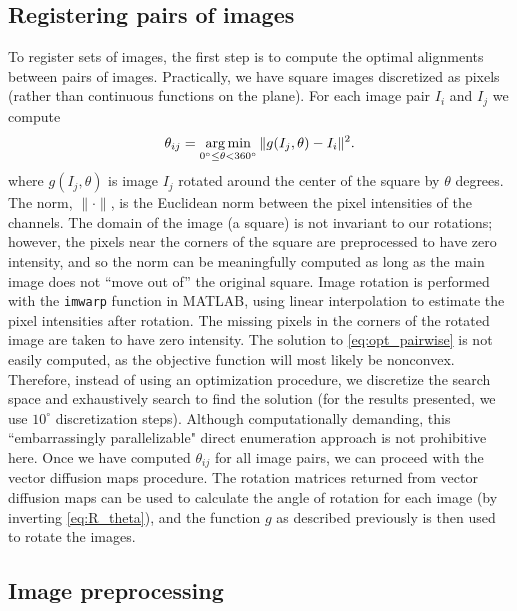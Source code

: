 \subsection{Registering pairs of images} \label{subsec:trans_rot_register}

To register sets of images,
the first step is to compute the optimal alignments between pairs of images.
%
Practically, we have square images discretized as pixels (rather than continuous functions on the plane).
%
For each image pair $I_i$ and $I_j$ we compute
\begin{equation}\label{eq:opt_pairwise}
\theta_{ij} = \operatorname*{arg\,min}_{
0^\circ \le \theta < 360^\circ }
 \|g(I_j, \theta) - I_i \|^2.
\end{equation}
where $g(I_j, \theta)$ is image $I_j$ rotated around the center of the square by $\theta$ degrees.
%
The norm, $\| \cdot \|$, is the Euclidean norm between the pixel intensities of the channels.
%
The domain of the image (a square) is not invariant to our rotations; however, the pixels near the corners of the square are preprocessed to have zero intensity, and so the norm can be meaningfully computed as long as the main image does not ``move out of'' the original square.
%
Image rotation is performed with the \texttt{imwarp} function in MATLAB, using linear interpolation to estimate the pixel intensities after rotation.
%
The missing pixels in the corners of the rotated image are taken to have zero intensity.
%
The solution to \eqref{eq:opt_pairwise} is not easily computed, as the objective function will most likely be nonconvex.
%
Therefore, instead of using an optimization procedure, we discretize the search space and exhaustively search to find the solution (for the results presented, we use $10^\circ$ discretization steps).
%
Although computationally demanding, this ``embarrassingly parallelizable" direct enumeration approach is not prohibitive here.
%
Once we have computed $\theta_{ij}$ for all image pairs, we can proceed with the vector diffusion maps procedure.
%
The rotation matrices returned from vector diffusion maps can be used to calculate the angle of rotation for each image (by inverting \eqref{eq:R_theta}), and the function $g$ as described previously is then used to rotate the images.



\subsection{Image preprocessing} \label{sec:image_preprocessing}

